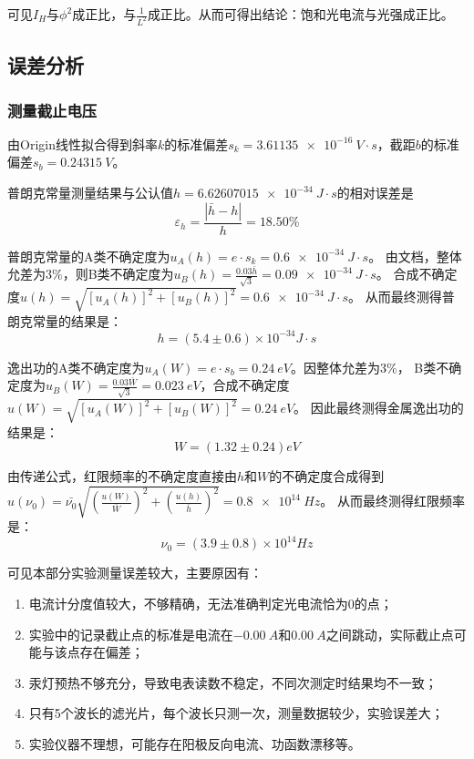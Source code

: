\documentclass[]{../../templates/Report}%
\begin{document}
\begin{fullreportonly}
可见$I_H$与$\phi^2$成正比，与$\frac{1}{L^2}$成正比。从而可得出结论：饱和光电流与光强成正比。

\subsection{误差分析}
\subsubsection{测量截止电压}
由Origin线性拟合得到斜率$k$的标准偏差$s_k = \SI{3.61135e-16}{V\cdot s}$，截距$b$的标准偏差$s_b = \SI{0.24315}{V}$。

普朗克常量测量结果与公认值$h = \SI{6.62607015e-34}{J\cdot s}$的相对误差是
\[\varepsilon_h = \frac{|\bar{h}-h|}{h} = 18.50\%\]


普朗克常量的A类不确定度为$u_A(h) = e\cdot s_k = \SI{0.6e-34}{J\cdot s}$。
由文档，整体允差为$3\%$，则B类不确定度为$u_B(h) = \frac{0.03\bar{h}}{\sqrt{3}} = \SI{0.09e-34}{J\cdot s}$。
合成不确定度$u(h) = \sqrt{[u_A(h)]^2 + [u_B(h)]^2} = \SI{0.6e-34}{J\cdot s}$。
从而最终测得普朗克常量的结果是：
\[h = (5.4 \pm 0.6)\times 10^{-34} \si{J\cdot s}\]

逸出功的A类不确定度为$u_A(W) = e\cdot s_b = \SI{0.24}{eV}$。因整体允差为$3\%$，
B类不确定度为$u_B(W) = \frac{0.03\bar{W}}{\sqrt{3}} = \SI{0.023}{eV}$，合成不确定度$u(W) = \sqrt{[u_A(W)]^2 +[u_B(W)]^2} = \SI{0.24}{eV}$。
因此最终测得金属逸出功的结果是：
\[W = (1.32 \pm 0.24) \si{eV}\]

由传递公式，红限频率的不确定度直接由$h$和$W$的不确定度合成得到
$u(\nu_0) = \bar{\nu_0} \sqrt{\left(\frac{u(W)}{\bar{W}}\right)^2 + \left(\frac{u(h)}{\bar{h}}\right)^2} = \SI{0.8e14}{Hz}$。
从而最终测得红限频率是：
\[\nu_0 = (3.9 \pm 0.8) \times 10^{14} \si{Hz}\]

可见本部分实验测量误差较大，主要原因有：
\begin{enumerate}
    \item 电流计分度值较大，不够精确，无法准确判定光电流恰为0的点；
    \item 实验中的记录截止点的标准是电流在$\SI{-0.00}{A}$和$\SI{0.00}{A}$之间跳动，实际截止点可能与该点存在偏差；
    \item 汞灯预热不够充分，导致电表读数不稳定，不同次测定时结果均不一致；
    \item 只有5个波长的滤光片，每个波长只测一次，测量数据较少，实验误差大；
    \item 实验仪器不理想，可能存在阳极反向电流、功函数漂移等。
\end{enumerate}


\end{fullreportonly}
\end{document}
